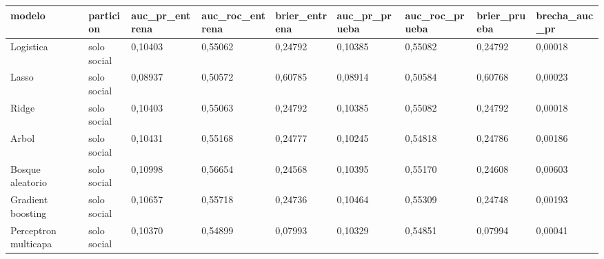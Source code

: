 \begin{tabular}{lllllllll}
\toprule
modelo & particion & auc\_pr\_entrena & auc\_roc\_entrena & brier\_entrena & auc\_pr\_prueba & auc\_roc\_prueba & brier\_prueba & brecha\_auc\_pr \\
\midrule
Logistica & solo social & 0{,}10403 & 0{,}55062 & 0{,}24792 & 0{,}10385 & 0{,}55082 & 0{,}24792 & 0{,}00018 \\
Lasso & solo social & 0{,}08937 & 0{,}50572 & 0{,}60785 & 0{,}08914 & 0{,}50584 & 0{,}60768 & 0{,}00023 \\
Ridge & solo social & 0{,}10403 & 0{,}55063 & 0{,}24792 & 0{,}10385 & 0{,}55082 & 0{,}24792 & 0{,}00018 \\
Arbol & solo social & 0{,}10431 & 0{,}55168 & 0{,}24777 & 0{,}10245 & 0{,}54818 & 0{,}24786 & 0{,}00186 \\
Bosque aleatorio & solo social & 0{,}10998 & 0{,}56654 & 0{,}24568 & 0{,}10395 & 0{,}55170 & 0{,}24608 & 0{,}00603 \\
Gradient boosting & solo social & 0{,}10657 & 0{,}55718 & 0{,}24736 & 0{,}10464 & 0{,}55309 & 0{,}24748 & 0{,}00193 \\
Perceptron multicapa & solo social & 0{,}10370 & 0{,}54899 & 0{,}07993 & 0{,}10329 & 0{,}54851 & 0{,}07994 & 0{,}00041 \\
\bottomrule
\end{tabular}
